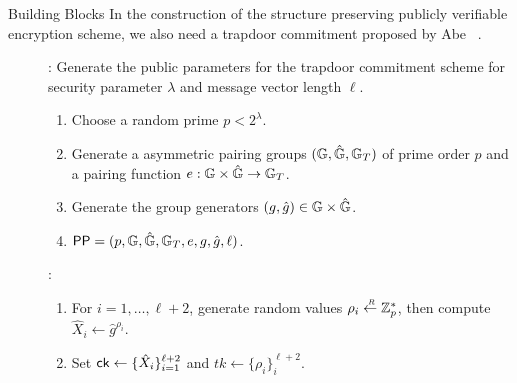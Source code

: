 \begin{subsection}{Building Blocks}
  In the construction of the structure preserving publicly verifiable encryption scheme, we also need a trapdoor commitment proposed by Abe \etal~\cite{DBLP:conf/eurocrypt/AbeKOT15}.

  \begin{description}
  \item[]: Generate the public parameters for the trapdoor commitment scheme for security parameter $\lambda$ and message vector length $\ell$. 
    \begin{enumerate}
    \item Choose a random prime $p< 2^{\lambda}$.
    \item Generate a asymmetric pairing groups $(\mathbb{G}, \hat{\mathbb{G}}, \mathbb{G}_T)$ of prime order $p$ and a pairing function $e : \mathbb{G} \times \hat{\mathbb{G}} \to \mathbb{G}_T$.
    \item Generate the group generators $(g, \hat{g}) \in \mathbb{G} \times \hat{\mathbb{G}}$.	
    \item $\mathsf{PP} = (p, \mathbb{G}, \hat{\mathbb{G}}, \mathbb{G}_T, e, g, \hat{g},\ell)$.
    \end{enumerate}

  \item[]:
    \begin{enumerate}
    \item For $i = 1, \dots, \ell+2$, generate random values $\rho_i \stackrel{{\scriptscriptstyle \mkern4mu R}}{\gets} \mathbb{Z}_p^*$, then compute $\hat{X}_i \gets \hat{g}^{\rho_i}$.
    \item Set $\mathsf{ck} \gets \{\hat{X}_i\}_{i = 1}^{\ell+2}$ and $tk \gets \{\rho_i\}_i^{\ell+2}$.
    \end{enumerate}



\end{description}
\end{subsection}
